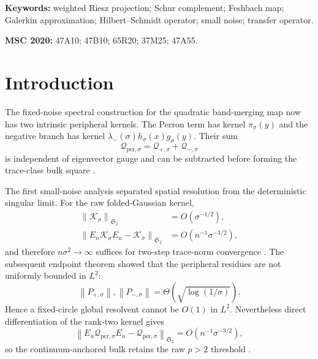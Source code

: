 \documentclass[11pt]{article}
\theoremstyle{definition}
\theoremstyle{remark}
\newcommand{\cK}{\mathcal K}
\newcommand{\cQ}{\mathcal Q}
\newcommand{\HS}{\mathfrak S_2}
\newcommand{\Qper}{\cQ_{\mathrm{per},\sigma}}
\newcommand{\norm}[1]{\left\lVert #1\right\rVert}
\begin{document}
\noindent\textbf{Keywords:} weighted Riesz projection; Schur complement;
Feshbach map; Galerkin approximation; Hilbert--Schmidt operator; small
noise; transfer operator.

\medskip
\noindent\textbf{MSC 2020:} 47A10; 47B10; 65R20; 37M25; 47A55.

\section{Introduction}
\label{sec:introduction}

The fixed-noise spectral construction for the quadratic band-merging map
now has two intrinsic peripheral kernels.  The Perron term has kernel
$\pi_\sigma(y)$ and the negative branch has kernel
$\lambda_-(\sigma)h_\sigma(x)g_\sigma(y)$.  Their sum
\begin{equation}
 \Qper
 =\cQ_{+,\sigma}+\cQ_{-,\sigma}
 \label{eq:qper-intro}
\end{equation}
is independent of eigenvector gauge and can be subtracted before forming
the trace-class bulk square
\citep{WangWeightedKernel2026,WangRankTwo2026}.

The first small-noise analysis separated spatial resolution from the
deterministic singular limit.  For the raw folded-Gaussian kernel,
\begin{align}
 \norm{\cK_\sigma}_{\HS}&=O(\sigma^{-1/2}),
 \label{eq:raw-size-intro}\\
 \norm{E_n\cK_\sigma E_n-\cK_\sigma}_{\HS}
 &=O(n^{-1}\sigma^{-3/2}),
 \label{eq:raw-mesh-intro}
\end{align}
and therefore $n\sigma^2\to\infty$ suffices for two-step trace-norm
convergence \citep{WangSmallNoiseMesh2026}.  The subsequent endpoint theorem
showed that the peripheral residues are not uniformly bounded in $L^2$:
\begin{equation}
 \norm{P_{+,\sigma}},\norm{P_{-,\sigma}}
 =\Theta\!\left(\sqrt{\log(1/\sigma)}\right).
 \label{eq:residue-log-intro}
\end{equation}
Hence a fixed-circle global resolvent cannot be $O(1)$ in $L^2$.
Nevertheless direct differentiation of the rank-two kernel gives
\begin{equation}
 \norm{E_n\Qper E_n-\Qper}_{\HS}
 =O(n^{-1}\sigma^{-3/2}),
 \label{eq:qper-compression-intro}
\end{equation}
so the continuum-anchored bulk retains the raw $p>2$ threshold
\citep{WangLogConditioning2026}.
\end{document}

